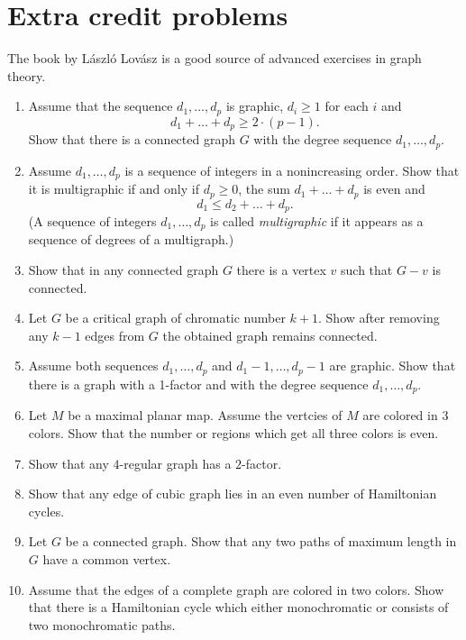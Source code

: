\chapter{Extra credit problems}

The book by L\'aszl\'o Lov\'asz \cite{lovasz} is a good source of advanced exercises in graph theory.

\begin{enumerate}

\item Assume that the sequence $d_1,\dots, d_p$ is graphic,
$d_i\ge 1$ for each $i$ and 
\[d_1+\dots+d_p\ge 2\cdot(p-1).\]
Show that there is a connected graph $G$ with the degree sequence $d_1,\dots, d_p$.

\item Assume $d_1,\dots, d_p$ is a sequence of integers in a nonincreasing order.
Show that it is multigraphic if and only if $d_p\ge0$, the sum $d_1+\dots+ d_p$ is even and 
\[d_1\le d_2+\dots+d_p.\]
(A sequence of integers $d_1,\dots, d_p$ is called \textit{multigraphic} if it appears as a sequence of degrees of a multigraph.)

\item Show that in any connected graph $G$ there is a vertex $v$ such that $G-v$ is connected.

\item Let $G$ be a critical graph of chromatic number $k+1$.
Show after removing any $k-1$ edges from $G$  
the obtained graph remains connected. 

\item Assume both sequences $d_1,\dots, d_p$
 and $d_1-1,\dots, d_p-1$ are graphic.
Show that there is a graph with a 1-factor and with the degree sequence $d_1,\dots, d_p$.

\item Let $M$ be a maximal planar map.
Assume the vertcies of $M$ are colored in 3 colors.
Show that the number or regions which get all three colors is even.

\item Show that any $4$-regular graph has a $2$-factor.

\item Show that any edge of cubic graph lies in an even number of Hamiltonian cycles.

\item Let $G$ be a  connected graph.
Show that any two paths of maximum length in $G$ have a common vertex.

\item Assume that the edges of a complete graph are colored in two colors.
Show that there is a Hamiltonian cycle which either monochromatic or consists of two monochromatic paths.


\end{enumerate}
